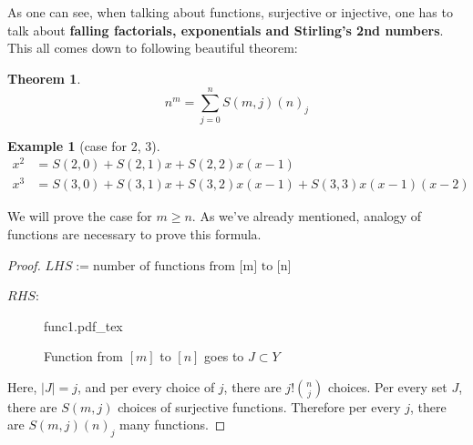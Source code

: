 \documentclass[12pt]{article}
\newtheorem{theorem}{Theorem}[section]
\newtheorem*{example}{Example}
\begin{document}
As one can see, when talking about functions, surjective or injective, one has to talk about \textbf{falling factorials, exponentials and Stirling's 2nd numbers}. This all comes down to following beautiful theorem:
\begin{theorem}
\[
n^m = \sum_{j=0}^{n} S(m,j)(n)_j
\]
\end{theorem}

\begin{example}[case for 2, 3]

\begin{align*}
x^2 &= S(2,0) + S(2,1)x + S(2,2)x(x-1) \\
x^3 &= S(3,0) + S(3,1)x + S(3,2)x(x-1) + S(3,3)x(x-1)(x-2)
\end{align*}

\end{example}

We will prove the case for $m\geq n$. As we've already mentioned, analogy of functions are necessary to prove this formula.
\begin{proof}
  $LHS := \text{number of functions from [m] to [n]}$

$RHS$:
\begin{figure}[H]
	\centering
	\def\svgwidth{\columnwidth}
	{func1.pdf_tex}
	\caption{Function from $[m]$ to $[n]$ goes to $J\subset Y$}
	\label{fig:func1}
\end{figure}
Here, $|J| = j$, and per every choice of $j$, there are $j! \binom{n}{j}$ choices. Per every set $J$, there are $S(m,j)$ choices of surjective functions.
Therefore per every $j$, there are $S(m,j) (n)_j$ many functions.
\end{proof}
\end{document}
